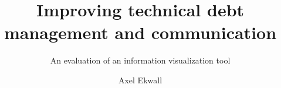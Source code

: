 \documentclass[sigchi, nonacm, balance=false, authorversion=true]{acmart}
\begin{document}
\title{Improving technical debt management and communication}
\subtitle{An evaluation of an information visualization tool}
\author{Axel Ekwall}




\maketitle














\appendix
\end{document}
